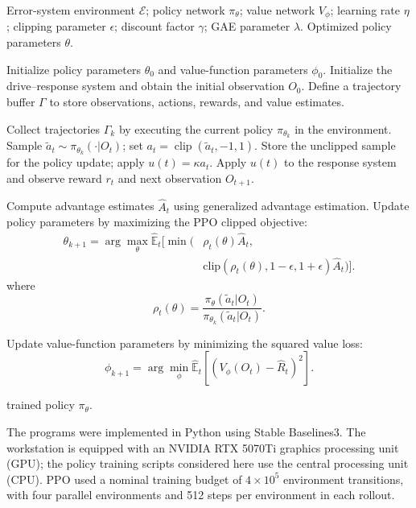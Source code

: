 \documentclass[a4paper,fleqn]{cas-dc}
\theoremstyle{plain}
\theoremstyle{definition}
\begin{document}
\begin{algorithm}[t]
	\caption{PPO-based Single-Input Pinning Control for the Error System}
	\label{alg:ppo_pinning}
	\begin{algorithmic}[1]
		\Require Error-system environment $\mathcal{E}$; policy network $\pi_{\theta}$; value network $V_{\phi}$; learning rate $\eta$; clipping parameter $\epsilon$; discount factor $\gamma$; GAE parameter $\lambda$.
		\Ensure Optimized policy parameters $\theta$.
		
		\State Initialize policy parameters $\theta_0$ and value-function parameters $\phi_0$.
		\State Initialize the drive--response system and obtain the initial observation $O_0$.
		\State Define a trajectory buffer $\Gamma$ to store observations, actions, rewards, and value estimates.
		
		\State Collect trajectories $\Gamma_k$ by executing the current policy $\pi_{\theta_k}$ in the environment.
		\State Sample $\widetilde a_t \sim \pi_{\theta_k}(\cdot|O_t)$; set $a_t=\operatorname{clip}(\widetilde a_t,-1,1)$.
		\State Store the unclipped sample for the policy update; apply $u(t)=\kappa a_t$.
		\State Apply $u(t)$ to the response system and observe reward $r_t$ and next observation $O_{t+1}$.
		\EndFor
		
		\State Compute advantage estimates $\hat{A}_t$ using generalized advantage estimation.
		\State Update policy parameters by maximizing the PPO clipped objective:
		\Statex
		\[
		\begin{aligned}
		\theta_{k+1}=\arg\max_{\theta}\hat{\mathbb{E}}_t\Big[
		\min\big(&\rho_t(\theta)\hat{A}_t,\\
		&\mathrm{clip}(\rho_t(\theta),1-\epsilon,1+\epsilon)\hat{A}_t\big)
		\Big].
		\end{aligned}
		\]
		\Statex
		where
		\[
		\rho_t(\theta)
		=\frac{\pi_{\theta}(\widetilde a_t|O_t)}
		{\pi_{\theta_k}(\widetilde a_t|O_t)}.
		\]
		
		\State Update value-function parameters by minimizing the squared value loss:
		\Statex
		\[
		\phi_{k+1}
		=
		\arg\min_{\phi}
		\hat{\mathbb{E}}_t
		\left[
		\left(
		V_{\phi}(O_t)-\hat{R}_t
		\right)^2
		\right].
		\]
		\EndFor
		
		\State \Return trained policy $\pi_{\theta}$.
	\end{algorithmic}
\end{algorithm}

The programs were implemented in Python using Stable Baselines3. The workstation is equipped with an NVIDIA RTX 5070Ti graphics processing unit (GPU); the policy training scripts considered here use the central processing unit (CPU). PPO used a nominal training budget of $4\times10^5$ environment transitions, with four parallel environments and 512 steps per environment in each rollout.
\end{document}
